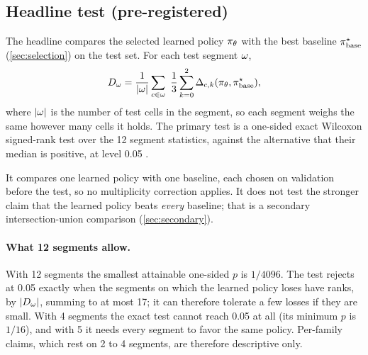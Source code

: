 \subsection{Headline test (pre-registered)}
\label{sec:headline}

The headline compares the selected learned policy $\pi_{\theta}$ with the best baseline $\pi^{\star}_{\mathrm{base}}$
(\cref{sec:selection}) on the test set. For each test segment $\omega$,
\begin{equation}
  \label{eq:segstat}
  \segstat_{\seg} = \frac{1}{|\seg|}\sum_{\cell \in \seg}\ \frac{1}{3}\sum_{\krep=0}^{2}
    \clr_{\cell,\krep}(\pilearn, \pibase),
\end{equation}
where $|\omega|$ is the number of test cells in the segment, so each segment weighs the same however
many cells it holds. The primary test is a one-sided exact Wilcoxon signed-rank test over the 12
segment statistics, against the alternative that their median is positive, at level 0.05
\citep{demsar2006}.

It compares one learned policy with one baseline, each chosen on validation before the test, so
no multiplicity correction applies. It does not test the stronger claim that the learned policy
beats \emph{every} baseline; that is a secondary intersection-union comparison
(\cref{sec:secondary}).

\paragraph{What 12 segments allow.}
With 12 segments the smallest attainable one-sided $p$ is $1/4096$. The test rejects at 0.05
exactly when the segments on which the learned policy loses have ranks, by $|D_{\omega}|$,
summing to at most 17; it can therefore tolerate a few losses if they are small. With 4 segments
the exact test cannot reach 0.05 at all (its minimum $p$ is $1/16$), and with 5 it needs every
segment to favor the same policy. Per-family claims, which rest on 2 to 4 segments, are
therefore descriptive only.

